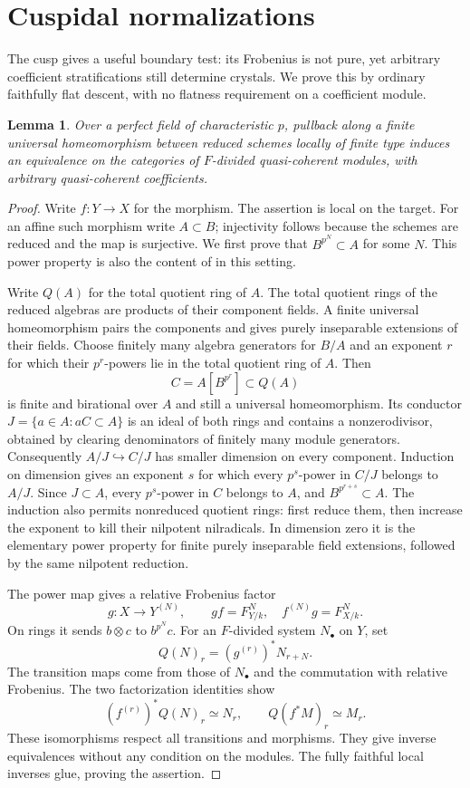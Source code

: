 \documentclass[11pt]{article}
\newtheorem{lemma}[theorem]{Lemma}\newtheorem{proposition}[theorem]{Proposition}
\theoremstyle{definition}\newtheorem{definition}[theorem]{Definition}
\theoremstyle{remark}\newtheorem{remark}[theorem]{Remark}
\begin{document}
\section{Cuspidal normalizations}

The cusp gives a useful boundary test: its Frobenius is not pure, yet arbitrary coefficient stratifications still determine crystals. We prove this by ordinary faithfully flat descent, with no flatness requirement on a coefficient module.

\begin{lemma}\label{lem:homeomorphism}
Over a perfect field of characteristic $p$, pullback along a finite universal homeomorphism between reduced schemes locally of finite type induces an equivalence on the categories of $F$-divided quasi-coherent modules, with arbitrary quasi-coherent coefficients.
\end{lemma}
\begin{proof}
Write $f:Y\to X$ for the morphism. The assertion is local on the target. For an affine such morphism write $A\subset B$; injectivity follows because the schemes are reduced and the map is surjective. We first prove that $B^{p^N}\subset A$ for some $N$. This power property is also the content of \cite[Lemma~29.47.9, Tag~0CNF]{StacksProject} in this setting.

Write $Q(A)$ for the total quotient ring of $A$. The total quotient rings of the reduced algebras are products of their component fields. A finite universal homeomorphism pairs the components and gives purely inseparable extensions of their fields. Choose finitely many algebra generators for $B/A$ and an exponent $r$ for which their $p^r$-powers lie in the total quotient ring of $A$. Then
\[
 C=A[B^{p^r}]\subset Q(A)
\]
is finite and birational over $A$ and still a universal homeomorphism. Its conductor $J=\{a\in A:aC\subset A\}$ is an ideal of both rings and contains a nonzerodivisor, obtained by clearing denominators of finitely many module generators. Consequently $A/J\hookrightarrow C/J$ has smaller dimension on every component. Induction on dimension gives an exponent $s$ for which every $p^s$-power in $C/J$ belongs to $A/J$. Since $J\subset A$, every $p^s$-power in $C$ belongs to $A$, and $B^{p^{r+s}}\subset A$. The induction also permits nonreduced quotient rings: first reduce them, then increase the exponent to kill their nilpotent nilradicals. In dimension zero it is the elementary power property for finite purely inseparable field extensions, followed by the same nilpotent reduction.

The power map gives a relative Frobenius factor
\[
 g:X\longrightarrow Y^{(N)},\qquad
 gf=F_{Y/k}^N,\quad f^{(N)}g=F_{X/k}^N.
\]
On rings it sends $b\otimes c$ to $b^{p^N}c$. For an $F$-divided system $N_\bullet$ on $Y$, set
\[
 Q(N)_r=(g^{(r)})^*N_{r+N}.
\]
The transition maps come from those of $N_\bullet$ and the commutation with relative Frobenius. The two factorization identities show
\[
 (f^{(r)})^*Q(N)_r\simeq N_r,\qquad
 Q(f^*M)_r\simeq M_r.
\]
These isomorphisms respect all transitions and morphisms. They give inverse equivalences without any condition on the modules. The fully faithful local inverses glue, proving the assertion.
\end{proof}
\end{document}
